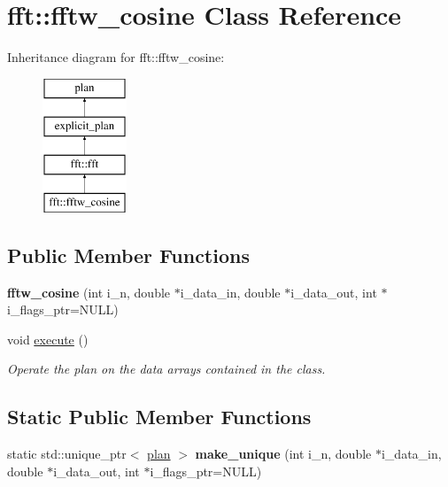 \hypertarget{classfft_1_1fftw__cosine}{\section{fft\-:\-:fftw\-\_\-cosine Class Reference}
\label{classfft_1_1fftw__cosine}
}
Inheritance diagram for fft\-:\-:fftw\-\_\-cosine\-:\begin{figure}[H]
\begin{center}
\leavevmode
\includegraphics[height=4.000000cm]{classfft_1_1fftw__cosine}
\end{center}
\end{figure}
\subsection*{Public Member Functions}
\begin{DoxyCompactItemize}
\item 
\hypertarget{classfft_1_1fftw__cosine_aa128d36dcaae5d10f150995ef8fcdfc9}{{\bfseries fftw\-\_\-cosine} (int i\-\_\-n, double $\ast$i\-\_\-data\-\_\-in, double $\ast$i\-\_\-data\-\_\-out, int $\ast$i\-\_\-flags\-\_\-ptr=N\-U\-L\-L)}\label{classfft_1_1fftw__cosine_aa128d36dcaae5d10f150995ef8fcdfc9}

\item 
void \hyperlink{classfft_1_1fftw__cosine_ace4fa808683bc426c4e2acc52ac955a7}{execute} ()
\begin{DoxyCompactList}\small\item\em Operate the plan on the data arrays contained in the class. \end{DoxyCompactList}\end{DoxyCompactItemize}
\subsection*{Static Public Member Functions}
\begin{DoxyCompactItemize}
\item 
\hypertarget{classfft_1_1fftw__cosine_a94e7267e0f12a0d3a747660c3c342ee7}{static std\-::unique\-\_\-ptr$<$ \hyperlink{classplan}{plan} $>$ {\bfseries make\-\_\-unique} (int i\-\_\-n, double $\ast$i\-\_\-data\-\_\-in, double $\ast$i\-\_\-data\-\_\-out, int $\ast$i\-\_\-flags\-\_\-ptr=N\-U\-L\-L)}\label{classfft_1_1fftw__cosine_a94e7267e0f12a0d3a747660c3c342ee7}

\end{DoxyCompactItemize}
